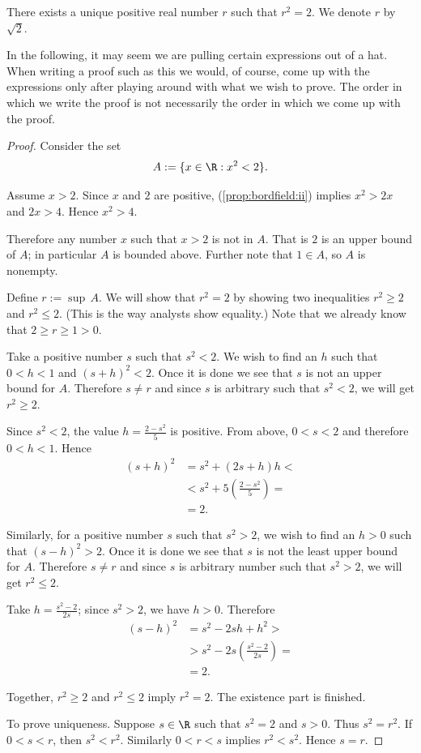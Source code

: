 \documentclass[12pt]{book}
\begin{document}
\begin{example} \label{example:sqrt2}
There exists a unique positive real number $r$ such that $r^2 = 2$.  
We denote $r$ by $\sqrt{2}$.

\medskip

In the following, it may seem we are pulling certain expressions out of a hat.  
When writing a proof such as this we would, of course, come up with the expressions only after playing around with what we wish to prove.  
The order in which we write the proof is not necessarily the order in which we come up with the proof.

\begin{proof}
Consider the set 
$$A := \{ x \in \R : x^2 < 2 \}.$$  

Assume $x> 2$.
Since $x$ and $2$ are positive, (\ref{prop:bordfield:ii}) implies 
$x^2> 2x$ and $2x> 4$. 
Hence $x^2 > 4$.

Therefore any number $x$ such that $x > 2$ is not in $A$.  
That is $2$ is an upper bound of $A$;
in particular $A$ is bounded above.
Further note that $1 \in A$, so $A$ is nonempty.

Define $r := \sup\, A$.  
We will show that $r^2 = 2$ by showing two inequalities $r^2 \geq 2$ and $r^2 \leq 2$.  
(This is the way analysts show equality.)
Note that we already know that $2\geq r \geq 1 > 0$.

Take a positive number $s$ such that $s^2 < 2$.  
We wish to find an $h$ such that $0<h<1$ and $(s+h)^2 < 2$.
Once it is done we see that $s$ is not an upper bound for $A$.
Therefore $s\ne r$ and since $s$ is arbitrary such that $s^2 < 2$, we will get $r^2\geq 2$.

Since $s^2<2$, the value $h=\tfrac{2-s^2}5$ is positive.
From above, $0<s<2$ and therefore $0<h<1$.
Hence
\begin{align*}
(s+h)^2&= s^2+(2s+h)h<
\\
&< s^2+5(\tfrac{2-s^2}5)=
\\
&=2.
\end{align*}

Similarly, for a positive number $s$ such that $s^2 > 2$,  
we wish to find an $h > 0$ such that ${(s-h)}^2 > 2$.
Once it is done we see that $s$ is not the least upper bound for $A$.
Therefore $s\ne r$ and since $s$ is arbitrary number such that $s^2 > 2$, we will get $r^2\leq 2$.

Take $h=\tfrac{s^2-2}{2s}$; since $s^2>2$, we have $h>0$.
Therefore
\begin{align*}
(s-h)^2&= s^2-2sh+h^2>
\\
&> s^2-2s(\tfrac{s^2-2}{2s})=
\\
&= 2.
\end{align*}


\medskip

Together, $r^2 \geq 2$ and $r^2 \leq 2$ imply $r^2 = 2$.  
The existence part is finished.

To prove uniqueness.  
Suppose $s \in \R$ such that $s^2 = 2$ and $s > 0$.
Thus $s^2 = r^2$.  
If $0 < s < r$, then $s^2 < r^2$.  
Similarly $0 < r < s$ implies $r^2 < s^2$.  
Hence $s = r$.
\end{proof}
\end{example}
\end{document}
